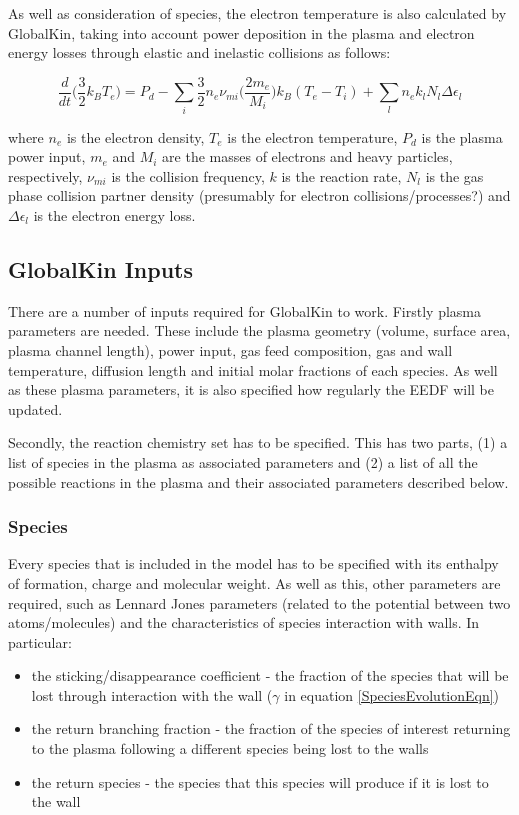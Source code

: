 \documentclass[11pt, oneside]{article}   	%
\begin{document}
As well as consideration of species, the electron temperature is also calculated by GlobalKin, taking into account power deposition in the plasma and electron energy losses through elastic and inelastic collisions as follows:

\begin{equation}
\frac{d}{dt}\Big(\frac{3}{2}k_BT_e\Big) = P_d - \sum_i\frac{3}{2}n_e\nu_{mi}\Big(\frac{2m_e}{M_i}\Big)k_B(T_e - T_i) + \sum_l n_ek_lN_l\Delta\epsilon_l
\label{ElectronTempEqn}
\end{equation}

where $n_e$ is the electron density, $T_e$ is the electron temperature, $P_d$ is the plasma power input, $m_e$ and $M_i$ are the masses of electrons and heavy particles, respectively, $\nu_{mi}$ is the collision frequency, $k$ is the reaction rate, $N_l$ is the gas phase collision partner density (presumably for electron collisions/processes?) and $\Delta\epsilon_l$ is the electron energy loss.

\subsection*{GlobalKin Inputs}
There are a number of inputs required for GlobalKin to work.
Firstly plasma parameters are needed.
These include the plasma geometry (volume, surface area, plasma channel length), power input, gas feed composition, gas and wall temperature, diffusion length and initial molar fractions of each species.
As well as these plasma parameters, it is also specified how regularly the EEDF will be updated.

Secondly, the reaction chemistry set has to be specified. 
This has two parts, (1) a list of species in the plasma as associated parameters and (2) a list of all the possible reactions in the plasma and their associated parameters described below.

\subsubsection*{Species}
Every species that is included in the model has to be specified with its enthalpy of formation, charge and molecular weight.
As well as this, other parameters are required, such as Lennard Jones parameters (related to the potential between two atoms/molecules) and the characteristics of species interaction with walls.
In particular:
\begin{itemize}
\item the sticking/disappearance coefficient - the fraction of the species that will be lost through interaction with the wall ($\gamma$ in equation \ref{SpeciesEvolutionEqn})
\item the return branching fraction - the fraction of the species of interest returning to the plasma following a different species being lost to the walls
\item the return species - the species that this species will produce if it is lost to the wall
\end{itemize}
\end{document}
